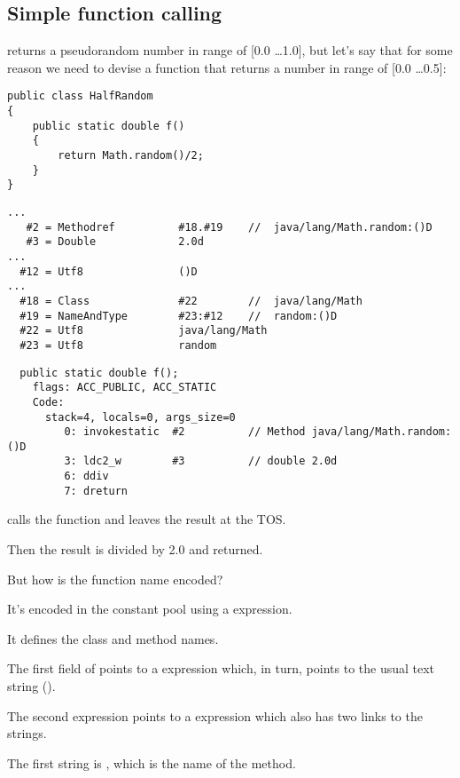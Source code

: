 \subsection{Simple function calling}

 returns a pseudorandom number in range of [0.0 \dots 1.0], but let's say that
for some reason we need to devise a function that returns a number in range of [0.0 \dots 0.5]:


\begin{lstlisting}[style=customjava]
public class HalfRandom
{ 
	public static double f()
	{
		return Math.random()/2;
	}
}
\end{lstlisting}

\begin{lstlisting}[caption=Constant pool]
...
   #2 = Methodref          #18.#19    //  java/lang/Math.random:()D
   #3 = Double             2.0d
...
  #12 = Utf8               ()D
...
  #18 = Class              #22        //  java/lang/Math
  #19 = NameAndType        #23:#12    //  random:()D
  #22 = Utf8               java/lang/Math
  #23 = Utf8               random
\end{lstlisting}

\begin{lstlisting}
  public static double f();
    flags: ACC_PUBLIC, ACC_STATIC
    Code:
      stack=4, locals=0, args_size=0
         0: invokestatic  #2          // Method java/lang/Math.random:()D
         3: ldc2_w        #3          // double 2.0d
         6: ddiv          
         7: dreturn       
\end{lstlisting}

 calls the  function and leaves the result at the \ac{TOS}.

Then the result is divided by 2.0 and returned.

But how is the function name encoded?

It's encoded in the constant pool using a  expression.

It defines the class and method names.

The first field of  points to a  expression which, in turn, points to
the usual text string ().

The second  expression points to a  expression which also 
has two links to the strings.

The first string is , which is the name of the method.

